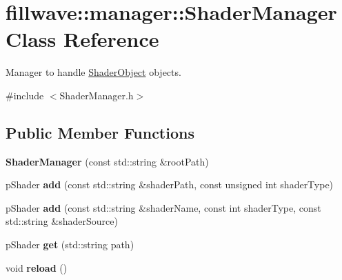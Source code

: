 \hypertarget{classfillwave_1_1manager_1_1ShaderManager}{}\section{fillwave\+:\+:manager\+:\+:Shader\+Manager Class Reference}
\label{classfillwave_1_1manager_1_1ShaderManager}


Manager to handle \hyperlink{structfillwave_1_1manager_1_1ShaderObject}{Shader\+Object} objects.  




{\ttfamily \#include $<$Shader\+Manager.\+h$>$}

\subsection*{Public Member Functions}
\begin{DoxyCompactItemize}
\item 
\hypertarget{classfillwave_1_1manager_1_1ShaderManager_aa6da923309f02ec556161e38b41bc8bd}{}{\bfseries Shader\+Manager} (const std\+::string \&root\+Path)\label{classfillwave_1_1manager_1_1ShaderManager_aa6da923309f02ec556161e38b41bc8bd}

\item 
\hypertarget{classfillwave_1_1manager_1_1ShaderManager_a8ee80535e3a842acdbe228a985944212}{}p\+Shader {\bfseries add} (const std\+::string \&shader\+Path, const unsigned int shader\+Type)\label{classfillwave_1_1manager_1_1ShaderManager_a8ee80535e3a842acdbe228a985944212}

\item 
\hypertarget{classfillwave_1_1manager_1_1ShaderManager_a2cfc23a1ff408f1071ec179b3b5a8ab4}{}p\+Shader {\bfseries add} (const std\+::string \&shader\+Name, const int shader\+Type, const std\+::string \&shader\+Source)\label{classfillwave_1_1manager_1_1ShaderManager_a2cfc23a1ff408f1071ec179b3b5a8ab4}

\item 
\hypertarget{classfillwave_1_1manager_1_1ShaderManager_ae1802c142785e5fd35319d082f3c0926}{}p\+Shader {\bfseries get} (std\+::string path)\label{classfillwave_1_1manager_1_1ShaderManager_ae1802c142785e5fd35319d082f3c0926}

\item 
\hypertarget{classfillwave_1_1manager_1_1ShaderManager_aa073e4c102c4ce86a8b9cdb010146af8}{}void {\bfseries reload} ()\label{classfillwave_1_1manager_1_1ShaderManager_aa073e4c102c4ce86a8b9cdb010146af8}

\end{DoxyCompactItemize}
